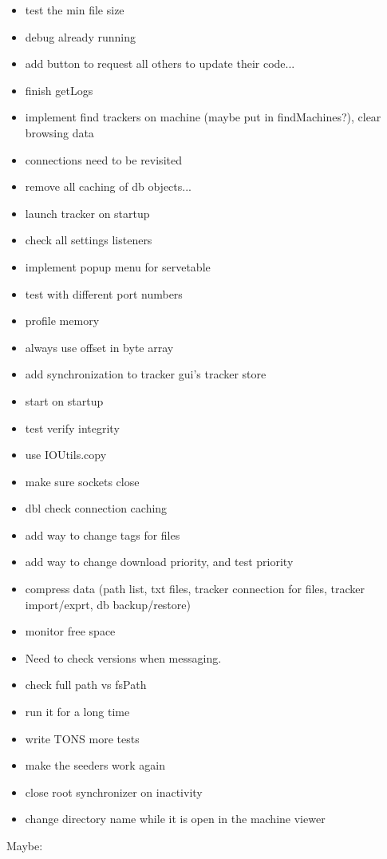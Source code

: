 \documentclass{article}
\begin{document}
\begin{itemize}
\item test the min file size
\item debug already running
\item add button to request all others to update their code...
\item finish getLogs
\item implement find trackers on machine (maybe put in findMachines?), clear browsing data
\item connections need to be revisited
\item remove all caching of db objects...
\item launch tracker on startup
\item check all settings listeners
\item implement popup menu for servetable
\item test with different port numbers
\item profile memory
\item always use offset in byte array
\item add synchronization to tracker gui's tracker store
\item start on startup
\item test verify integrity
\item use IOUtils.copy
\item make sure sockets close
\item dbl check connection caching
\item add way to change tags for files 
\item add way to change download priority, and test priority
\item compress data (path list, txt files, tracker connection for files, tracker import/exprt, db backup/restore)
\item monitor free space
\item Need to check versions when messaging.
\item check full path vs fsPath
\item run it for a long time
\item write TONS more tests
\item make the seeders work again

\item close root synchronizer on inactivity
\item change directory name while it is open in the machine viewer
\end{itemize}
Maybe:
\end{document}
